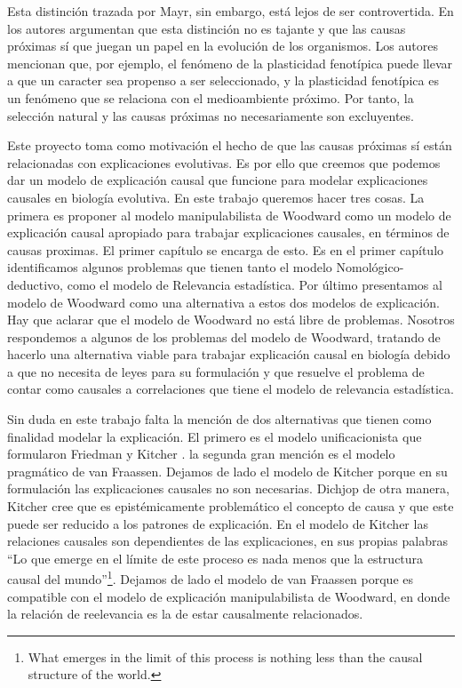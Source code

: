 Esta distinción trazada por Mayr, sin embargo, está lejos de ser controvertida. En \cite{Laland2011} los autores argumentan que esta distinción no es tajante y que las causas próximas sí que juegan un papel en la evolución de los organismos. Los autores mencionan que, por ejemplo, el fenómeno de la plasticidad fenotípica puede llevar a que un caracter sea propenso a ser seleccionado, y la plasticidad fenotípica es un fenómeno que se relaciona con el medioambiente próximo. Por tanto, la selección natural y las causas próximas no necesariamente son excluyentes.

Este proyecto toma como motivación el hecho de que las causas próximas sí están relacionadas con explicaciones evolutivas. Es por ello que creemos que podemos dar un modelo de explicación causal que funcione para modelar explicaciones causales en biología evolutiva. En este trabajo queremos hacer tres cosas. La primera es proponer al modelo manipulabilista de Woodward  \cite{Woodward2000, Woodward2003} como un modelo de explicación causal apropiado para trabajar explicaciones causales, en términos de causas proximas. El primer capítulo se encarga de esto. Es en el primer capítulo identificamos algunos problemas que tienen tanto el modelo Nomológico-deductivo, como el modelo de Relevancia estadística. Por último presentamos al modelo de Woodward como una alternativa a estos dos modelos de explicación. Hay que aclarar que el modelo de Woodward no está libre de problemas. Nosotros respondemos a algunos de los problemas del modelo de Woodward, tratando de hacerlo una alternativa viable para trabajar explicación causal en biología debido a que no necesita de leyes para su formulación y que resuelve el problema de contar como causales a correlaciones que tiene el modelo de relevancia estadística.

Sin duda en este trabajo falta la mención de dos alternativas que tienen como finalidad modelar la explicación. El primero es el modelo unificacionista que formularon Friedman \citeyear{Friedman1974} y Kitcher \cite{Kitcher2002}. la segunda gran mención es el modelo pragmático de van Fraassen. Dejamos de lado el modelo de Kitcher porque en su formulación las explicaciones causales no son necesarias. Dichjop de otra manera, Kitcher cree que es epistémicamente problemático el concepto de causa y que este puede ser reducido a los patrones de explicación. En el modelo de Kitcher las relaciones causales son dependientes de las explicaciones, en sus propias palabras ``Lo que emerge en el límite de este proceso es nada menos que la estructura causal del mundo''\footnote{What emerges in the limit of this process is nothing less than the causal structure of the world.}. Dejamos de lado el modelo de van Fraassen porque es compatible con el modelo de explicación manipulabilista de Woodward, en donde la relación de reelevancia es la de estar causalmente relacionados.

